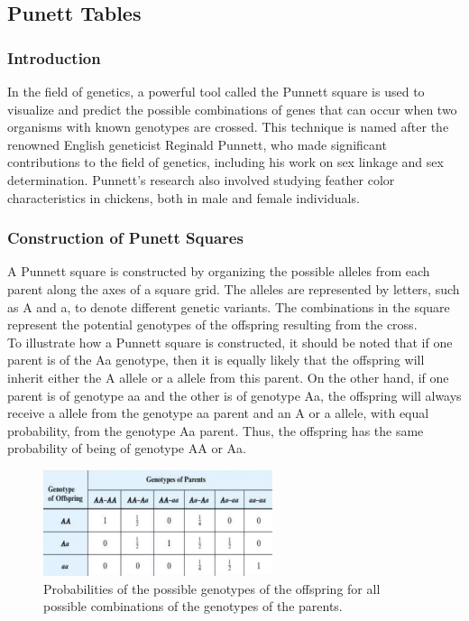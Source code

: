 \documentclass[a4paper,12pt]{article}
\begin{document}
\subsection{Punett Tables}
\subsubsection{Introduction}
In the field of genetics, a powerful tool called the Punnett square is used to visualize and predict the possible combinations of genes that can occur when two organisms with known genotypes are crossed. This technique is named after the renowned English geneticist Reginald Punnett, who made significant contributions to the field of genetics, including his work on sex linkage and sex determination. Punnett's research also involved studying feather color characteristics in chickens, both in male and female individuals.
\subsubsection{Construction of Punett Squares}
A Punnett square is constructed by organizing the possible alleles from each parent along the axes of a square grid. The alleles are represented by letters, such as A and a, to denote different genetic variants. The combinations in the square represent the potential genotypes of the offspring resulting from the cross.\ \\
To illustrate how a Punnett square is constructed, it should be noted that if one parent is of the Aa genotype, then it is equally likely that the offspring will inherit either the A allele or a allele from this parent. On the other hand, if one parent is of genotype aa and the other is of genotype Aa, the offspring will always receive a allele from the genotype aa parent and an A or a allele, with equal probability, from the genotype Aa parent. Thus, the offspring has the same probability of being of genotype AA or Aa.
\begin{figure}[h]
\centering
\includegraphics[width=0.6\textwidth]{Di_Hybrid_Cross.png}
\caption{Probabilities of the possible genotypes of the offspring for all possible combinations of the genotypes of the parents.}
\label{fig:Punett-table}
\end{figure}
\end{document}
